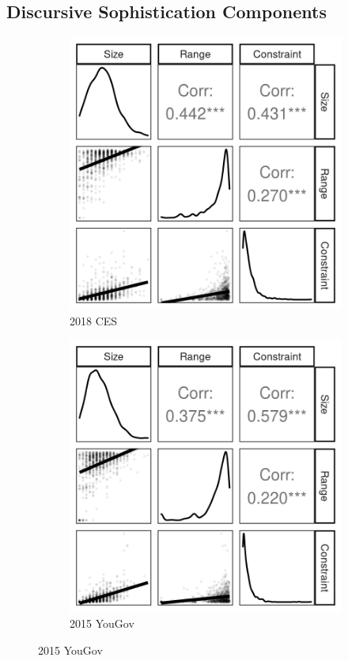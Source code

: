 \subsection{Discursive Sophistication Components}
\begin{figure}[h]
    \centering
    \begin{subfigure}[h]{0.27\textwidth}
    	\centering
    	\includegraphics[width=\textwidth]{../fig/cces2018_components.png}
    	\caption{2018 CES}
    \end{subfigure}%
    \begin{subfigure}[h]{0.27\textwidth}
		\centering
		\includegraphics[width=\textwidth]{../fig/yg_components.png}
		\caption{2015 YouGov}
	\end{subfigure}%


\end{figure}

